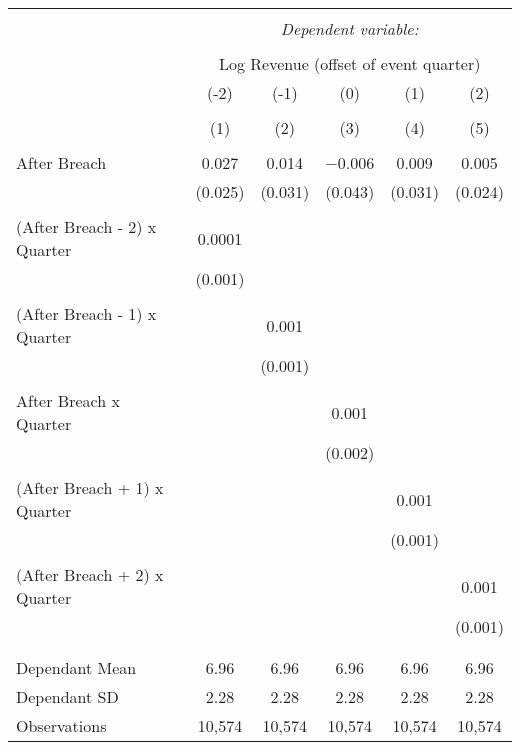 
\begin{table}[!htbp] \centering 
  \caption{} 
  \label{} 
\begin{tabular}{@{\extracolsep{5pt}}lccccc} 
\\[-1.8ex]\hline 
\hline \\[-1.8ex] 
 & \multicolumn{5}{c}{\textit{Dependent variable:}} \\ 
\cline{2-6} 
\\[-1.8ex] & \multicolumn{5}{c}{Log Revenue (offset of event quarter)} \\ 
 & (-2) & (-1) & (0) & (1) & (2) \\ 
\\[-1.8ex] & (1) & (2) & (3) & (4) & (5)\\ 
\hline \\[-1.8ex] 
 After Breach & 0.027 & 0.014 & $-$0.006 & 0.009 & 0.005 \\ 
  & (0.025) & (0.031) & (0.043) & (0.031) & (0.024) \\ 
  & & & & & \\ 
 (After Breach - 2) x Quarter & 0.0001 &  &  &  &  \\ 
  & (0.001) &  &  &  &  \\ 
  & & & & & \\ 
 (After Breach - 1) x Quarter &  & 0.001 &  &  &  \\ 
  &  & (0.001) &  &  &  \\ 
  & & & & & \\ 
 After Breach x Quarter &  &  & 0.001 &  &  \\ 
  &  &  & (0.002) &  &  \\ 
  & & & & & \\ 
 (After Breach + 1) x Quarter &  &  &  & 0.001 &  \\ 
  &  &  &  & (0.001) &  \\ 
  & & & & & \\ 
 (After Breach + 2) x Quarter &  &  &  &  & 0.001 \\ 
  &  &  &  &  & (0.001) \\ 
  & & & & & \\ 
\hline \\[-1.8ex] 
Dependant Mean & 6.96 & 6.96 & 6.96 & 6.96 & 6.96 \\ 
Dependant SD & 2.28 & 2.28 & 2.28 & 2.28 & 2.28 \\ 
Observations & 10,574 & 10,574 & 10,574 & 10,574 & 10,574 \\ 

\end{tabular}
\end{table}
